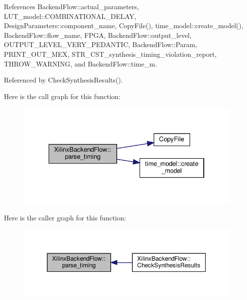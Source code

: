 References Backend\+Flow\+::actual\+\_\+parameters, L\+U\+T\+\_\+model\+::\+C\+O\+M\+B\+I\+N\+A\+T\+I\+O\+N\+A\+L\+\_\+\+D\+E\+L\+AY, Design\+Parameters\+::component\+\_\+name, Copy\+File(), time\+\_\+model\+::create\+\_\+model(), Backend\+Flow\+::flow\+\_\+name, F\+P\+GA, Backend\+Flow\+::output\+\_\+level, O\+U\+T\+P\+U\+T\+\_\+\+L\+E\+V\+E\+L\+\_\+\+V\+E\+R\+Y\+\_\+\+P\+E\+D\+A\+N\+T\+IC, Backend\+Flow\+::\+Param, P\+R\+I\+N\+T\+\_\+\+O\+U\+T\+\_\+\+M\+EX, S\+T\+R\+\_\+\+C\+S\+T\+\_\+synthesis\+\_\+timing\+\_\+violation\+\_\+report, T\+H\+R\+O\+W\+\_\+\+W\+A\+R\+N\+I\+NG, and Backend\+Flow\+::time\+\_\+m.



Referenced by Check\+Synthesis\+Results().

Here is the call graph for this function\+:
\nopagebreak
\begin{figure}[H]
\begin{center}
\leavevmode
\includegraphics[width=322pt]{d6/d94/classXilinxBackendFlow_a7316d2350ad8ab06e640e91d7b7baad3_cgraph}
\end{center}
\end{figure}
Here is the caller graph for this function\+:
\nopagebreak
\begin{figure}[H]
\begin{center}
\leavevmode
\includegraphics[width=344pt]{d6/d94/classXilinxBackendFlow_a7316d2350ad8ab06e640e91d7b7baad3_icgraph}
\end{center}
\end{figure}
\mbox{\label{classXilinxBackendFlow_a4606bf711aee0e82892bb50e73eaa6e1}} 
